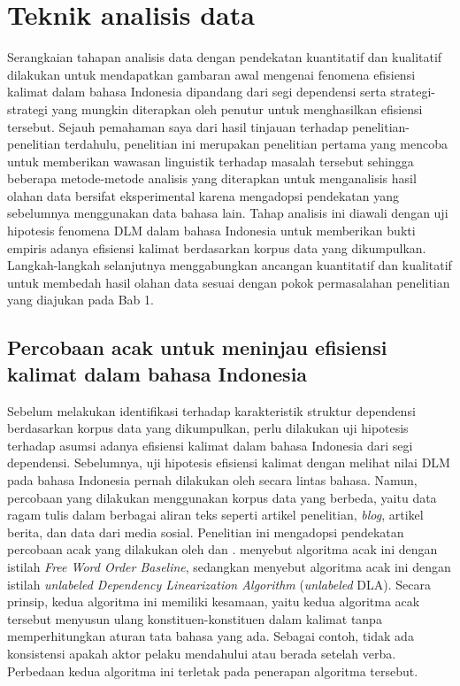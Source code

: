\section{Teknik analisis data}

Serangkaian tahapan analisis data dengan pendekatan kuantitatif dan kualitatif dilakukan untuk mendapatkan gambaran awal mengenai fenomena efisiensi kalimat dalam bahasa Indonesia dipandang dari segi dependensi serta strategi-strategi yang mungkin diterapkan oleh penutur untuk menghasilkan efisiensi tersebut. Sejauh pemahaman saya dari hasil tinjauan terhadap penelitian-penelitian terdahulu, penelitian ini merupakan penelitian pertama yang mencoba untuk memberikan wawasan linguistik terhadap masalah tersebut sehingga beberapa metode-metode analisis yang diterapkan untuk menganalisis hasil olahan data bersifat eksperimental karena mengadopsi pendekatan yang sebelumnya menggunakan data bahasa lain. Tahap analisis ini diawali dengan uji hipotesis fenomena DLM dalam bahasa Indonesia untuk memberikan bukti empiris adanya efisiensi kalimat berdasarkan korpus data yang dikumpulkan. Langkah-langkah selanjutnya menggabungkan ancangan kuantitatif dan kualitatif untuk membedah hasil olahan data sesuai dengan pokok permasalahan penelitian yang diajukan pada Bab 1.

\subsection{Percobaan acak untuk meninjau efisiensi kalimat dalam bahasa Indonesia}
Sebelum melakukan identifikasi terhadap karakteristik struktur dependensi berdasarkan korpus data yang dikumpulkan, perlu dilakukan uji hipotesis terhadap asumsi adanya efisiensi kalimat dalam bahasa Indonesia dari segi dependensi. Sebelumnya, uji hipotesis efisiensi kalimat dengan melihat nilai DLM pada bahasa Indonesia pernah dilakukan oleh \cite{futrell2015large} secara lintas bahasa. Namun, percobaan yang dilakukan \cite{futrell2015large} menggunakan korpus data yang berbeda, yaitu data ragam tulis dalam berbagai aliran teks seperti artikel penelitian, \textit{blog}, artikel berita, dan data dari media sosial. Penelitian ini mengadopsi pendekatan percobaan acak yang dilakukan oleh \cite{futrell2015large} dan \cite{gildea2010grammars}. \cite{futrell2015large} menyebut algoritma acak ini dengan istilah \textit{Free Word Order Baseline}, sedangkan \cite{gildea2010grammars} menyebut algoritma acak ini dengan istilah \textit{unlabeled Dependency Linearization Algorithm} (\textit{unlabeled} DLA). Secara prinsip, kedua algoritma ini memiliki kesamaan, yaitu kedua algoritma acak tersebut menyusun ulang konstituen-konstituen dalam kalimat tanpa memperhitungkan aturan tata bahasa yang ada. Sebagai contoh, tidak ada konsistensi apakah aktor pelaku mendahului atau berada setelah verba. Perbedaan kedua algoritma ini terletak pada penerapan algoritma tersebut. 

